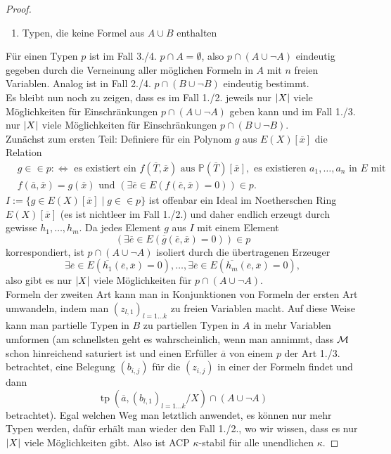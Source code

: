 \begin{proof}
\begin{enumerate}
		\item Typen, die keine Formel aus $A\cup B$ enthalten
	\end{enumerate}
	Für einen Typen $p$ ist im Fall 3./4. $p\cap A=\emptyset$, also $p\cap(A\cup\neg A)$ eindeutig gegeben durch die Verneinung aller möglichen Formeln in $A$ mit $n$ freien Variablen. Analog ist in Fall 2./4. $p\cap(B\cup\neg B)$ eindeutig bestimmt.\\
	Es bleibt nun noch zu zeigen, dass es im Fall 1./2. jeweils nur ${\left| X \right|}$ viele Möglichkeiten für Einschränkungen $p\cap(A\cup\neg A)$ geben kann und im Fall 1./3. nur ${\left| X \right|}$ viele Möglichkeiten für Einschränkungen $p\cap(B\cup\neg B)$.\\
	Zunächst zum ersten Teil: Definiere für ein Polynom $g$ aus $E(X)[\overline{x}]$ die Relation
	\begin{align*}&g\in\in p:\Leftrightarrow\text{ es existiert ein }f(\overline{T},\overline{x})\text{ aus }\mathbb{P}(\overline{T})[\overline{x}],\text{ es existieren }a_1,\dots,a_n\text{ in }E\text{ mit }\\
	&f(\overline{a},\overline{x})=g(\overline{x})\text{ und }\left(\exists\overline{e}\in E(f(\overline{e},\overline{x})=0)\right)\in p.
	\end{align*}
	$I:=\{g\in E(X)[\overline{x}]\mid g\in\in p\}$ ist offenbar ein Ideal im Noetherschen Ring $E(X)[\overline{x}]$ (es ist nichtleer im Fall 1./2.) und daher endlich erzeugt durch gewisse $h_1,\dots,h_m$. Da jedes Element $g$ aus $I$ mit einem Element $$\left(\exists\overline{e}\in E(\overline{g}(\overline{e},\overline{x})=0)\right)\in p$$ korrespondiert, ist $p\cap(A\cup\neg A)$ isoliert durch die übertragenen Erzeuger $$\exists\overline{e}\in E(\overline{h_1}(\overline{e},\overline{x})=0),\dots,\exists\overline{e}\in E(\overline{h_m}(\overline{e},\overline{x})=0),$$ also gibt es nur ${\left| X \right|}$ viele Möglichkeiten für $p\cap(A\cup\neg A)$.\\
	Formeln der zweiten Art kann man in Konjunktionen von Formeln der ersten Art umwandeln, indem man $(z_{l,1})_{l=1\dots k}$ zu freien Variablen macht. Auf diese Weise kann man partielle Typen in $B$ zu partiellen Typen in $A$ in mehr Variablen umformen (am schnellsten geht es wahrscheinlich, wenn man annimmt, dass $\mathcal{M}$ schon hinreichend saturiert ist und einen Erfüller $\overline{a}$ von einem $p$ der Art 1./3. betrachtet, eine Belegung $(b_{i,j})$ für die $(z_{i,j})$ in einer der Formeln findet und dann $$\operatorname{tp}(\overline{a},(b_{l,1})_{l=1\dots k}/X)\cap(A\cup\neg A)$$ betrachtet). Egal welchen Weg man letztlich anwendet, es können nur mehr Typen werden, dafür erhält man wieder den Fall 1./2., wo wir wissen, dass es nur ${\left| X \right|}$ viele Möglichkeiten gibt. Also ist ACP $\kappa$-stabil für alle unendlichen $\kappa$.
\end{proof}